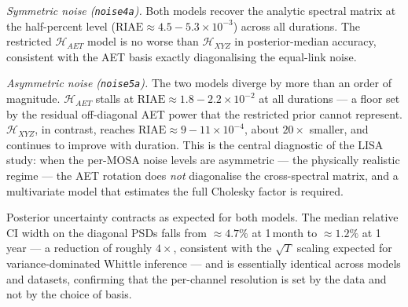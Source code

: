 \documentclass[%
	reprint,
	nofootinbib,
	amsmath,
	amssymb,
	aps,
]{revtex4-2}
\begin{document}
	\emph{Symmetric noise (\texttt{noise4a}).} Both models recover the
	analytic spectral matrix at the half-percent level
	($\mathrm{RIAE}\approx 4.5\!-\!5.3\times10^{-3}$) across all
	durations. The restricted $\mathcal{H}_{AET}$ model is no worse
	than $\mathcal{H}_{XYZ}$ in posterior-median accuracy, consistent
	with the AET basis exactly diagonalising the equal-link noise.

	\emph{Asymmetric noise (\texttt{noise5a}).} The two models diverge
	by more than an order of magnitude. $\mathcal{H}_{AET}$
	stalls at $\mathrm{RIAE}\approx 1.8\!-\!2.2\times10^{-2}$ at all
	durations --- a floor set by the residual off-diagonal AET power
	that the restricted prior cannot represent. $\mathcal{H}_{XYZ}$,
	in contrast, reaches $\mathrm{RIAE}\approx 9\!-\!11\times10^{-4}$,
	about $20\times$ smaller, and continues to improve with duration.
	This is the central diagnostic of the LISA study: when the
	per-MOSA noise levels are asymmetric --- the physically realistic
	regime --- the AET rotation does \emph{not} diagonalise the
	cross-spectral matrix, and a multivariate model that estimates
	the full Cholesky factor is required.

	Posterior uncertainty contracts as expected for both models. The
	median relative CI width on the diagonal PSDs falls from
	$\approx\!4.7\%$ at 1\,month to $\approx\!1.2\%$ at 1\,year ---
	a reduction of roughly $4\times$, consistent with the $\sqrt{T}$
	scaling expected for variance-dominated Whittle inference --- and
	is essentially identical across models and datasets, confirming
	that the per-channel resolution is set by the data and not by the
	choice of basis.
\end{document}
